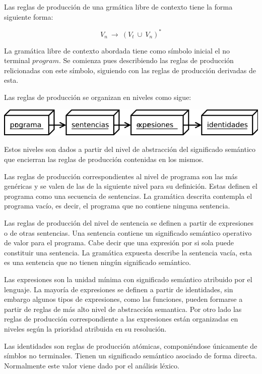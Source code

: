 Las reglas de producción de una grmática libre de contexto tiene la forma siguiente forma:

$$V_n\ \rightarrow\ (V_t\ \cup\ V_n)^*$$ 

La gramática libre de contexto abordada tiene como símbolo inicial 
el no terminal $program$. Se comienza pues describiendo las reglas de producción 
relicionadas con este símbolo, siguiendo con las reglas de producción derivadas 
de esta. 

Las reglas de producción se organizan en niveles como sigue:

\begin{center}
\includegraphics[scale=0.7]{diagram/omi.png} \\
\end{center}

Estos niveles son dados a partir del nivel de abstracción del significado 
semántico que encierran las reglas de producción contenidas en los mismos.

Las reglas de producción correspondientes al nivel de programa 
son las más genéricas y se valen de las de la siguiente nivel para 
su definición. Estas definen el programa como una secuencia de
sentencias. La gramática descrita contempla el programa vacío, es decir,
el programa que no contiene ninguna sentencia.

Las reglas de producción del nivel de sentencia se definen a 
partir de expresiones o de otras sentencias. Una sentencia contiene un significado semántico
operativo de valor para el programa. Cabe decir que una expresión por si sola 
puede constituir una sentencia. La gramática expuesta describe la sentencia
vacía, esta es una sentencia que no tienen ningún significado semántico.

Las expresiones son la unidad mínima con significado semántico atribuido por 
el lenguaje. La mayoría de expresiones se definen a partir de identidades, 
sin embargo algunos tipos de expresiones, como las funciones, pueden formarse
a partir de reglas de más alto nivel de abstracción semantica. Por otro lado las 
reglas de producción correspondiente a las expresiones están organizadas en niveles según
la prioridad atribuida en su resolución.

Las identidades son reglas de producción atómicas, componiéndose únicamente de símblos no terminales. 
Tienen un significado semántico asociado de forma directa. Normalmente este valor viene dado por 
el análisis léxico.  
 
